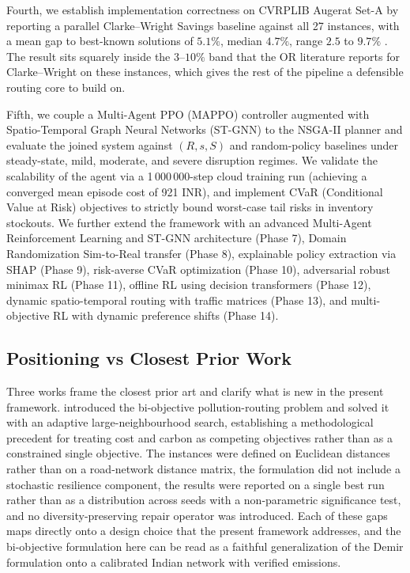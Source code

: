 \documentclass[review,preprint,authoryear,12pt]{elsarticle}
\begin{document}
Fourth, we establish implementation correctness on CVRPLIB Augerat
Set-A by reporting a parallel Clarke--Wright Savings baseline against
all 27 instances, with a mean gap to best-known solutions of $5.1\%$,
median $4.7\%$, range $2.5$ to $9.7\%$
\citep{augerat1995cvrp_branch_and_cut}. The result sits squarely
inside the $3$--$10\%$ band that the OR literature reports for
Clarke--Wright on these instances, which gives the rest of the
pipeline a defensible routing core to build on.

Fifth, we couple a Multi-Agent PPO (MAPPO) controller augmented with Spatio-Temporal Graph Neural Networks (ST-GNN) to the NSGA-II planner and evaluate the joined system against $(R, s, S)$ and random-policy baselines under steady-state, mild, moderate, and severe disruption regimes. We validate the scalability of the agent via a 1\,000\,000-step cloud training run (achieving a converged mean episode cost of 921 INR), and implement CVaR (Conditional Value at Risk) objectives to strictly bound worst-case tail risks in inventory stockouts. We further extend the framework with an advanced Multi-Agent Reinforcement Learning and ST-GNN architecture (Phase 7), Domain Randomization Sim-to-Real transfer (Phase 8), explainable policy extraction via SHAP (Phase 9), risk-averse CVaR optimization (Phase 10), adversarial robust minimax RL (Phase 11), offline RL using decision transformers (Phase 12), dynamic spatio-temporal routing with traffic matrices (Phase 13), and multi-objective RL with dynamic preference shifts (Phase 14).

\subsection{Positioning vs Closest Prior Work}

Three works frame the closest prior art and clarify what is new in the
present framework. \citet{demir2014bi_objective_prp} introduced the
bi-objective pollution-routing problem and solved it with an adaptive
large-neighbourhood search, establishing a methodological precedent for
treating cost and carbon as competing objectives rather than as a
constrained single objective. The instances were defined on Euclidean
distances rather than on a road-network distance matrix, the
formulation did not include a stochastic resilience component, the
results were reported on a single best run rather than as a
distribution across seeds with a non-parametric significance test, and
no diversity-preserving repair operator was introduced. Each of these
gaps maps directly onto a design choice that the present framework
addresses, and the bi-objective formulation here can be read as a
faithful generalization of the Demir formulation onto a calibrated
Indian network with verified emissions.
\end{document}
